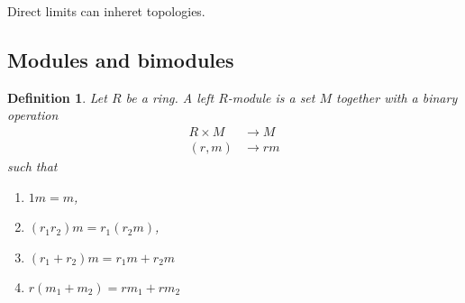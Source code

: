 \documentclass[12pt]{report}
\theoremstyle{plain}
\newtheorem{defn}[thm]{Definition}
\newtheorem{prop}[thm]{Proposition}
\begin{document}
Direct limits can inheret topologies.


\iffalse

\section{Tensor producs}

\begin{defn}
Let $V$ and $W$ be $F$-vector spaces. The tensor product $V \otimes W = V
\otimes_F W$ is the vector space generated by all symbols of the form $v
\otimes w$, subject to the relations
\begin{enumerate}
\item $\lambda (v \otimes w) = \lambda v \otimes w = v \otimes \lambda w$
for $\lambda \in F$, $v, w \in V$
\item $(v + v') \otimes w = v \otimes w + v' \otimes w$ for $v, v', w \in
V$
\item $v \otimes (w + w') = v \otimes w + v \otimes w'$ for $v, w, w' \in
V$
\end{enumerate}
\end{defn}

\begin{prop}
Suppose that $V$ and $W$ are vector spaces with bases $\{v_i\}_{i \in I}$
and $\{w_j\}_{j \in J}$ respectively. Then $V \otimes_F W$ has a basis given
by $\{v_i \otimes w_j\}_{(i, j) \in I \times J}$. In particular, if $V$ and
$W$ are finite dimensional, then $\dim_F(V \otimes_F W) = (\dim_F V)(\dim_F
W)$.
\end{prop}
\begin{proof}
Consider the maps $f_k : V \otimes W \to W$ and $g_\ell: V \otimes W \to V$
given by 
\[f_k(\sum_{i,j} v_i \otimes w_j) = \sum  \]
\end{proof}

\begin{defn}
Let $F$ be a field. An (associative, unital) $F$-algebra is a $F$-vector
space $A$, together with a multiplication $A$
\end{defn}


\fi

\iffalse

\subsection{Modules and bimodules}

\begin{defn}
Let $R$ be a ring. A left $R$-module is a set $M$ together with a binary
operation
\begin{align*}
R \times M &\to M \\
(r, m) &\to rm
\end{align*}
such that
\begin{enumerate}[1. ]
\item $1 m = m$, 
\item $(r_1 r_2) m = r_1 (r_2 m)$, 
\item $(r_1 + r_2)m = r_1m + r_2 m$
\item $r(m_1 + m_2) = rm_1 + rm_2$
\end{enumerate}
\end{defn}
\end{document}
